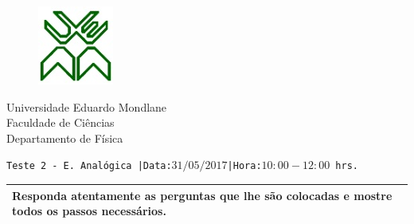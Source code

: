 \documentclass[11pt,a4paper,twoside]{report}
\author{Bartolomeu J. Ubisse}
\begin{document}
\begin{figure}[htb]

\centering
\includegraphics[scale=1]{UEM-logotipo}
\end{figure}
\centering
{ \Large Universidade Eduardo Mondlane}\\[0.3cm] 
\large Faculdade de Ci\^encias\\[0.2cm]
 \large Departamento de F\'isica\\[0.5cm]

\begin{flushleft}
\tt Teste 2 - E. Anal\'ogica\hspace{0.25cm} |Data:$31/05/2017$\hspace{0.25cm}|Hora:$10:00-12:00$ hrs.\\
\hrulefill
 \begin{table}[htb]
\centering
\begin{tabular}{p{16.55cm}}
\hline
\cellcolor[gray]{0.95}
Responda atentamente as perguntas que lhe s\~ao colocadas e mostre todos os passos necess\'arios.\\

 \hline
\end{tabular}
\end{table}
\end{flushleft}
\end{document}
